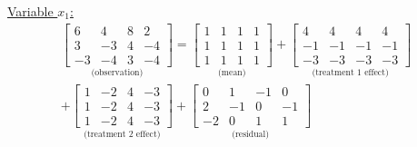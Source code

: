 \begin{enumerate}[label= (\alph*)]
\underline{Variable $x_{1}$:}
    \begin{multline*}
        \underset{\text{(observation)}}{
            \left[
                \begin{array}{rrrr}
                    6 &  4 & 8 &  2 \\
                    3 & -3 & 4 & -4 \\
                    -3 & -4 & 3 & -4
                \end{array}
            \right]
        }
        =
        \underset{\text{(mean)}}{
            \left[
                \begin{array}{rrrr}
                    1 & 1 & 1 & 1 \\
                    1 & 1 & 1 & 1 \\
                    1 & 1 & 1 & 1
                \end{array}
            \right]
        }
        +
        \underset{\text{(treatment 1 effect)}}{
            \left[
                \begin{array}{rrrr}
                    4 &  4 &  4 &  4 \\
                    -1 & -1 & -1 & -1 \\
                    -3 & -3 & -3 & -3
                \end{array}
            \right]
        }
        \\
        +
        \underset{\text{(treatment 2 effect)}}{
            \left[
                \begin{array}{rrrr}
                    1 & -2 & 4 & -3 \\
                    1 & -2 & 4 & -3 \\
                    1 & -2 & 4 & -3
                \end{array}
            \right]
        }
        +
        \underset{\text{(residual)}}{
            \left[
                \begin{array}{rrrr}
                    0 &  1 & -1 &  0 \\
                    2 & -1 &  0 & -1 \\
                    -2 &  0 &  1 &  1
                \end{array}
            \right]
        }
    \end{multline*}



\end{enumerate}
